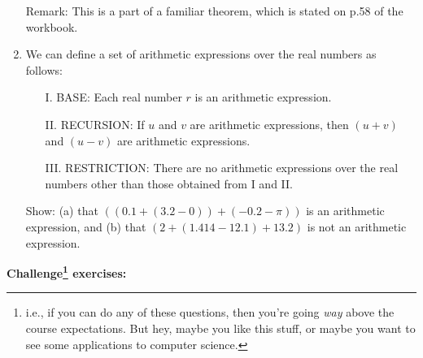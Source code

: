 \documentclass[a4paper,12pt]{article}
\begin{document}
\begin{enumerate}
Remark: This is a part of a familiar theorem, which is stated on p.58 of the
workbook.
\item
We can define a set of arithmetic expressions over the real numbers as follows:
\begin{itemize}
\item[I.] BASE: Each real number $r$ is an arithmetic expression.
\item[II.] RECURSION: If $u$ and $v$ are arithmetic expressions, then $(u+v)$
and $(u-v)$ are arithmetic expressions.
\item[III.] RESTRICTION: There are no arithmetic expressions over the real
numbers other than those obtained from I and II.
\end{itemize}
Show: (a) that $((0.1+(3.2-0))+(-0.2-\pi))$ is an arithmetic expression, and
(b) that $(2 + (1.414 - 12.1) + 13.2)$ is not an arithmetic expression.
\end{enumerate}

\newpage

{\bf Challenge\footnote{i.e., if you can do any of these questions,
then you're going {\em way} above the course expectations. But hey, maybe you
like this stuff, or maybe you want to see some applications to computer science.}
exercises:}
\end{document}
